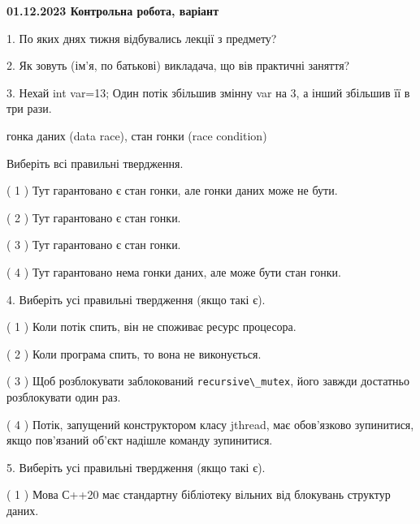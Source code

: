 \documentclass[12pt, ukrainian]{article}
\def\code#1{\Verb!#1!}
\begin{document}
\vspace{4mm}
\newpage
\begin {large}

\textbf{01.12.2023 Контрольна робота, варіант  }\par


{
1. По яких днях тижня відбувались лекції з предмету?



\vspace{5mm}
2. Як зовуть (ім'я, по батькові) викладача, що вів практичні заняття?



\vspace{5mm}
3. Нехай int var=13; Один потік збільшив змінну var на 3, а інший збільшив її в три рази.

гонка даних (data race), стан гонки (race condition)

Виберіть всі правильні твердження.\par
\vspace{2mm}
( 1 ) Тут гарантовано є стан гонки, але гонки даних може не бути.%

( 2 ) Тут гарантовано є стан гонки.%

( 3 ) Тут гарантовано є стан гонки.%

( 4 ) Тут гарантовано нема гонки даних, але може бути стан гонки.%


\vspace{5mm}
4. Виберіть усі правильні твердження (якщо такі є).\par
\vspace{2mm}

( 1 ) Коли потік спить, він не споживає ресурс процесора.%

( 2 ) Коли програма спить, то вона не виконується.%

( 3 ) Щоб розблокувати заблокований \code{recursive\_mutex}, його завжди достатньо розблокувати один раз.%

( 4 ) Потік, запущений конструктором класу jthread, має обов’язково зупинитися, якщо пов’язаний об’єкт надішле команду зупинитися.%


\vspace{5mm}
5. Виберіть усі правильні твердження (якщо такі є).\par
\vspace{2mm}

( 1 ) Мова С++20 має стандартну бібліотеку вільних від блокувань структур даних.%

}
\end{large}
\end{document}
